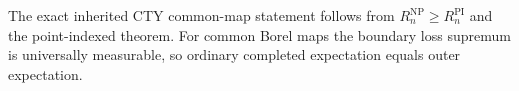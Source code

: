 The exact inherited CTY common-map statement follows from \(R_n^{\mathrm{NP}}\geq R_n^{\mathrm{PI}}\) and the point-indexed theorem.  For common Borel maps the boundary loss supremum is universally measurable, so ordinary completed expectation equals outer expectation.
